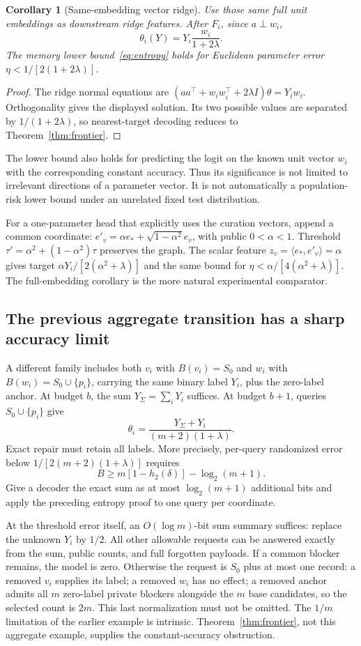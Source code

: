 \documentclass[11pt,a4paper]{article}
\newtheorem{corollary}[theorem]{Corollary}
\theoremstyle{definition}\newtheorem{definition}[theorem]{Definition}
\begin{document}
\begin{corollary}[Same-embedding vector ridge]\label{cor:shared}
Use those same full unit embeddings as downstream ridge features. After $F_i$, since $a\perp w_i$,
\[
 \theta_i(Y)=Y_i\frac{w_i}{1+2\lambda}.
\]
The memory lower bound~\eqref{eq:entropy} holds for Euclidean parameter error $\eta<1/[2(1+2\lambda)]$.
\end{corollary}
\begin{proof}
The ridge normal equations are $(aa^\top+w_iw_i^\top+2\lambda I)\theta=Y_iw_i$. Orthogonality gives the displayed solution. Its two possible values are separated by $1/(1+2\lambda)$, so nearest-target decoding reduces to Theorem~\ref{thm:frontier}.
\end{proof}
The lower bound also holds for predicting the logit on the known unit vector $w_i$ with the corresponding constant accuracy. Thus its significance is not limited to irrelevant directions of a parameter vector. It is not automatically a population-risk lower bound under an unrelated fixed test distribution.

For a one-parameter head that explicitly uses the curation vectors, append a common coordinate: $e'_v=\alpha e_*+\sqrt{1-\alpha^2}e_v$, with public $0<\alpha<1$. Threshold $\tau'=\alpha^2+(1-\alpha^2)\tau$ preserves the graph. The scalar feature $z_v=\langle e_*,e'_v\rangle=\alpha$ gives target $\alpha Y_i/[2(\alpha^2+\lambda)]$ and the same bound for $\eta<\alpha/[4(\alpha^2+\lambda)]$. The full-embedding corollary is the more natural experimental comparator.

\subsection{The previous aggregate transition has a sharp accuracy limit}
A different family includes both $v_i$ with $B(v_i)=S_0$ and $w_i$ with $B(w_i)=S_0\cup\{p_i\}$, carrying the same binary label $Y_i$, plus the zero-label anchor. At budget $b$, the sum $Y_\Sigma=\sum_iY_i$ suffices. At budget $b+1$, queries $S_0\cup\{p_i\}$ give
\[
 \theta_i=\frac{Y_\Sigma+Y_i}{(m+2)(1+\lambda)}.
\]
Exact repair must retain all labels. More precisely, per-query randomized error below $1/[2(m+2)(1+\lambda)]$ requires
\[
 B\ge m[1-h_2(\delta)]-\log_2(m+1).
\]
Give a decoder the exact sum as at most $\log_2(m+1)$ additional bits and apply the preceding entropy proof to one query per coordinate.

At the threshold error itself, an $O(\log m)$-bit sum summary suffices: replace the unknown $Y_i$ by $1/2$. All other allowable requests can be answered exactly from the sum, public counts, and full forgotten payloads. If a common blocker remains, the model is zero. Otherwise the request is $S_0$ plus at most one record: a removed $v_i$ supplies its label; a removed $w_i$ has no effect; a removed anchor admits all $m$ zero-label private blockers alongside the $m$ base candidates, so the selected count is $2m$. This last normalization must not be omitted. The $1/m$ limitation of the earlier example is intrinsic. Theorem~\ref{thm:frontier}, not this aggregate example, supplies the constant-accuracy obstruction.
\end{document}
